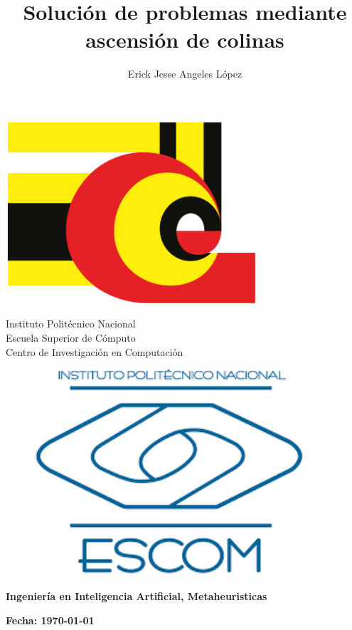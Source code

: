 \documentclass[12pt,twoside]{article}
\title{Solución de problemas mediante ascensión de colinas}
\author{Erick Jesse Angeles López}
\date{}
\begin{document}
	
	\begin{center}
		
		\begin{minipage}{0.17\textwidth}
			\centering
			\includegraphics[width=0.7\textwidth]{img/cic_logo.png} %
		\end{minipage}
		\begin{minipage}{.55\textwidth}
			\centering
			{\Large Instituto Politécnico Nacional}\\
			{\Large Escuela Superior de Cómputo}\\
			{\Large Centro de Investigación en Computación}
		\end{minipage}
		\begin{minipage}{0.17\textwidth}
			\centering
			\includegraphics[width=0.9\textwidth]{img/escom_logo} %
		\end{minipage}			
	\end{center}
	
	
	\centerline{\bf Ingeniería en Inteligencia Artificial, Metaheuristicas}
	
	\centerline{\bf Fecha: \today}
	
\end{document}
